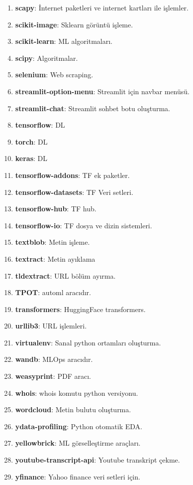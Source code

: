\begin{enumerate}
    \item \textbf{scapy}: İnternet paketleri ve internet kartları ile işlemler.
    \item \textbf{scikit-image}: Sklearn görüntü işleme.
    \item \textbf{scikit-learn}: ML algoritmaları.
    \item \textbf{scipy}: Algoritmalar.
    \item \textbf{selenium}: Web scraping.
    \item \textbf{streamlit-option-menu}: Streamlit için navbar menüsü.
    \item \textbf{streamlit-chat}: Streamlit sohbet botu oluşturma.
    \item \textbf{tensorflow}: DL
    \item \textbf{torch}: DL
    \item \textbf{keras}: DL
    \item \textbf{tensorflow-addons}: TF ek paketler.
    \item \textbf{tensorflow-datasets}: TF Veri setleri.
    \item \textbf{tensorflow-hub}: TF hub.
    \item \textbf{tensorflow-io}: TF dosya ve dizin sistemleri.
    \item \textbf{textblob}: Metin işleme.
    \item \textbf{textract}: Metin ayıklama
    \item \textbf{tldextract}: URL bölüm ayırma.
    \item \textbf{TPOT}: automl aracıdır.
    \item \textbf{transformers}: HuggingFace transformers.
    \item \textbf{urllib3}: URL işlemleri.
    \item \textbf{virtualenv}: Sanal python ortamları oluşturma.
    \item \textbf{wandb}: MLOps aracıdır.
    \item \textbf{weasyprint}: PDF aracı.
    \item \textbf{whois}: whois komutu python versiyonu.
    \item \textbf{wordcloud}: Metin bulutu oluşturma.
    \item \textbf{ydata-profiling}: Python otomatik EDA.
    \item \textbf{yellowbrick}: ML görselleştirme araçları.
    \item \textbf{youtube-transcript-api}: Youtube transkript çekme.
    \item \textbf{yfinance}: Yahoo finance veri setleri için.

\end{enumerate}
